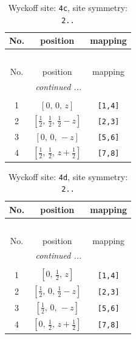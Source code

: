 \documentclass[fleqn,8pt]{jsarticle}
\begin{document}
\renewcommand{\arraystretch}{1.2}
\begin{longtable}{ccc}
\caption{Wyckoff site: {\tt 4c}, site symmetry: {\tt 2..}}
 \\
 \hline \hline
No. & position & mapping \\ \hline \endfirsthead

\multicolumn{2}{l}{\tablename\ \thetable{}} \\
 \hline \hline
No. & position & mapping \\ \hline \endhead

 \hline \hline
\multicolumn{2}{r}{\footnotesize\it continued ...} \\ \endfoot

 \hline \hline
\multicolumn{2}{r}{} \\ \endlastfoot

1 & $\left[ 0,\, 0,\, z \right]$ & {\tt [1,4]} \\ \hline
2 & $\left[ \frac{1}{2},\, \frac{1}{2},\, \frac{1}{2} - z \right]$ & {\tt [2,3]} \\ \hline
3 & $\left[ 0,\, 0,\, - z \right]$ & {\tt [5,6]} \\ \hline
4 & $\left[ \frac{1}{2},\, \frac{1}{2},\, z + \frac{1}{2} \right]$ & {\tt [7,8]} \\
\end{longtable}
\renewcommand{\arraystretch}{1.2}
\begin{longtable}{ccc}
\caption{Wyckoff site: {\tt 4d}, site symmetry: {\tt 2..}}
 \\
 \hline \hline
No. & position & mapping \\ \hline \endfirsthead

\multicolumn{2}{l}{\tablename\ \thetable{}} \\
 \hline \hline
No. & position & mapping \\ \hline \endhead

 \hline \hline
\multicolumn{2}{r}{\footnotesize\it continued ...} \\ \endfoot

 \hline \hline
\multicolumn{2}{r}{} \\ \endlastfoot

1 & $\left[ 0,\, \frac{1}{2},\, z \right]$ & {\tt [1,4]} \\ \hline
2 & $\left[ \frac{1}{2},\, 0,\, \frac{1}{2} - z \right]$ & {\tt [2,3]} \\ \hline
3 & $\left[ \frac{1}{2},\, 0,\, - z \right]$ & {\tt [5,6]} \\ \hline
4 & $\left[ 0,\, \frac{1}{2},\, z + \frac{1}{2} \right]$ & {\tt [7,8]} \\
\end{longtable}
\end{document}
